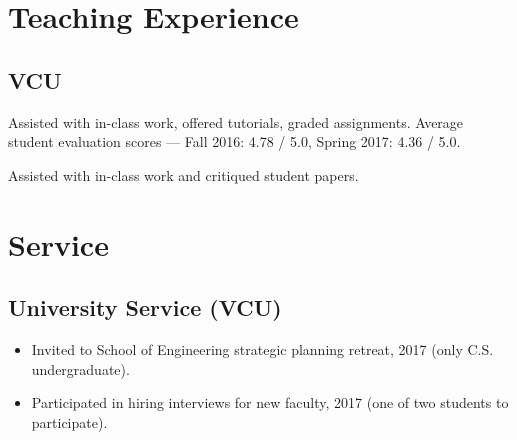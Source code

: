 \documentclass[11pt,letterpaper,serif]{moderncv}
\begin{document}


\section{Teaching Experience}
\subsection{VCU}
{
	\begin{adjustwidth}{.25in}{}
		Assisted with in-class work, offered tutorials, graded assignments. \newline
		Average student evaluation scores --- Fall 2016: 4.78 / 5.0, Spring 2017: 4.36 / 5.0.
	\end{adjustwidth}
}


{
	\begin{adjustwidth}{.25in}{}
		Assisted with in-class work and critiqued student papers.
	\end{adjustwidth}
}


\section{Service}
\subsection{University Service (VCU)}
{
	\begin{adjustwidth}{.25in}{}
		\begin{itemize}%
			\item Invited to School of Engineering strategic planning retreat, 2017 (only C.S. undergraduate).
			\item Participated in hiring interviews for new faculty, 2017 (one of two students to participate).
		\end{itemize}
	\end{adjustwidth}
}
\end{document}

